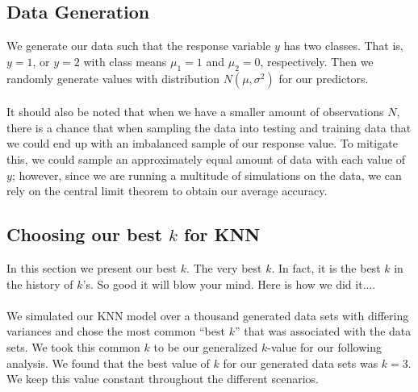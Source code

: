 \documentclass[11pt, oneside]{article}
\begin{document}
\subsection{Data Generation} 
We generate our data such that the response variable $y$ has two classes. That is, $y=1$, or $y=2$ with class means $\mu_1=1$ and $\mu_2=0$, respectively. Then we randomly generate values with distribution $N(\mu, \sigma^2)$ for our predictors.\\
\\
It should also be noted that when we have a smaller amount of observations $N$, there is a chance that when sampling the data into testing and training data that we could end up with an imbalanced sample of our response value. To mitigate this, we could sample an approximately equal amount of data with each value of $y$; however, since we are running a multitude of simulations on the data, we can rely on the central limit theorem to obtain our average accuracy.\\ 


\subsection{Choosing our best $k$ for KNN}
In this section we present our best $k$. The very best $k$. In fact, it is the best $k$ in the history of $k$'s. So good it will blow your mind. Here is how we did it....\\
\\
We simulated our KNN model over a thousand generated data sets with differing variances and chose the most common ``best $k$'' that was associated with the data sets. We took this common $k$ to be our generalized $k$-value for our following analysis. We found that the best value of $k$ for our generated data sets was $k = 3$. We keep this value constant throughout the different scenarios.\\
\\
\end{document}
